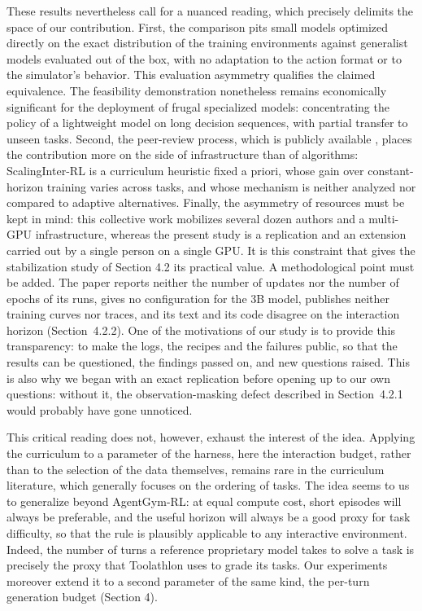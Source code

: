 \documentclass[11pt,a4paper]{article}
\begin{document}
These results nevertheless call for a nuanced reading, which precisely delimits the space of our contribution. First, the comparison pits small models optimized directly on the exact distribution of the training environments against generalist models evaluated out of the box, with no adaptation to the action format or to the simulator's behavior. This evaluation asymmetry qualifies the claimed equivalence. The feasibility demonstration nonetheless remains economically significant for the deployment of frugal specialized models: concentrating the policy of a lightweight model on long decision sequences, with partial transfer to unseen tasks. Second, the peer-review process, which is publicly available \cite{xi_agentgymrl_openreview}, places the contribution more on the side of infrastructure than of algorithms: ScalingInter-RL is a curriculum heuristic fixed a priori, whose gain over constant-horizon training varies across tasks, and whose mechanism is neither analyzed nor compared to adaptive alternatives. Finally, the asymmetry of resources must be kept in mind: this collective work mobilizes several dozen authors and a multi-GPU infrastructure, whereas the present study is a replication and an extension carried out by a single person on a single GPU. It is this constraint that gives the stabilization study of Section 4.2 its practical value. A methodological point must be added. The paper reports neither the number of updates nor the number of epochs of its runs, gives no configuration for the 3B model, publishes neither training curves nor traces, and its text and its code disagree on the interaction horizon (Section~4.2.2). One of the motivations of our study is to provide this transparency: to make the logs, the recipes and the failures public, so that the results can be questioned, the findings passed on, and new questions raised. This is also why we began with an exact replication before opening up to our own questions: without it, the observation-masking defect described in Section~4.2.1 would probably have gone unnoticed.


This critical reading does not, however, exhaust the interest of the idea. Applying the curriculum to a parameter of the harness, here the interaction budget, rather than to the selection of the data themselves, remains rare in the curriculum literature, which generally focuses on the ordering of tasks. The idea seems to us to generalize beyond AgentGym-RL: at equal compute cost, short episodes will always be preferable, and the useful horizon will always be a good proxy for task difficulty, so that the rule is plausibly applicable to any interactive environment. Indeed, the number of turns a reference proprietary model takes to solve a task is precisely the proxy that Toolathlon uses to grade its tasks. Our experiments moreover extend it to a second parameter of the same kind, the per-turn generation budget (Section 4).
\end{document}
